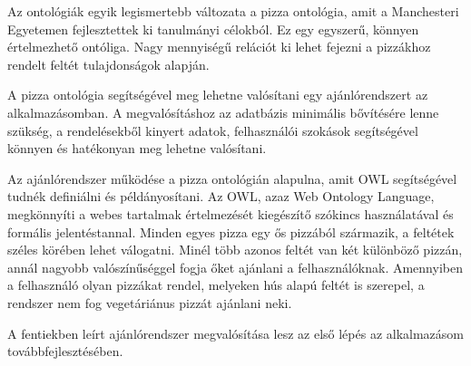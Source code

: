 Az ontológiák egyik legismertebb változata a pizza ontológia, amit a Manchesteri Egyetemen fejlesztettek ki tanulmányi célokból. Ez egy egyszerű, könnyen értelmezhető ontóliga. Nagy mennyiségű relációt ki lehet fejezni a pizzákhoz rendelt feltét tulajdonságok alapján.

A pizza ontológia segítségével meg lehetne valósítani egy ajánlórendszert az alkalmazásomban. A megvalósításhoz az adatbázis minimális bővítésére lenne szükség, a rendelésekből kinyert adatok, felhasználói szokások segítségével könnyen és hatékonyan meg lehetne valósítani.

Az ajánlórendszer működése a pizza ontológián alapulna, amit OWL segítségével tudnék definiálni és példányosítani. Az OWL, azaz Web Ontology Language, megkönnyíti a webes tartalmak értelmezését kiegészítő szókincs használatával és formális jelentéstannal. Minden egyes pizza egy ős pizzából származik, a feltétek széles körében lehet válogatni. Minél több azonos feltét van két különböző pizzán, annál nagyobb valószínűséggel fogja őket ajánlani a felhasználóknak. Amennyiben a felhasználó olyan pizzákat rendel, melyeken hús alapú feltét is szerepel, a rendszer nem fog vegetáriánus pizzát ajánlani neki.

A fentiekben leírt ajánlórendszer megvalósítása lesz az első lépés az alkalmazásom továbbfejlesztésében. 

